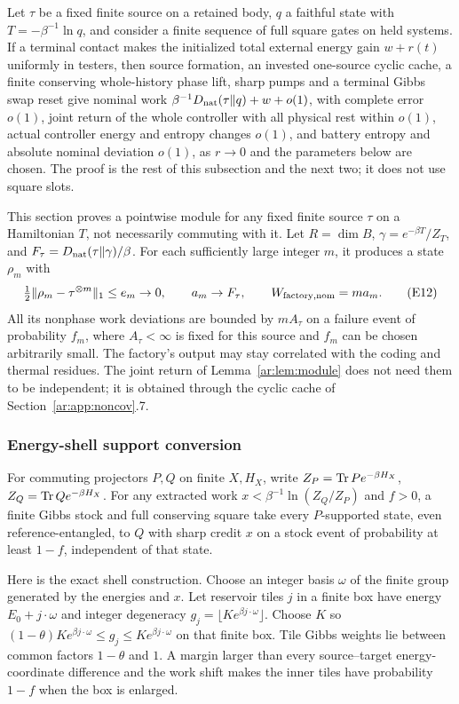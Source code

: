 \begin{lemma}\label{ar:lem:module}
Let $\tau$ be a fixed finite source on a retained body, $q$ a faithful state with $T=-\beta^{-1}\ln q$, and consider a finite sequence of full square gates on held systems. If a terminal contact makes the initialized total external energy gain $w+r(t)$ uniformly in testers, then source formation, an invested one-source cyclic cache, a finite conserving whole-history phase lift, sharp pumps and a terminal Gibbs swap reset give nominal work $\beta^{-1}D_{\mathrm{nat}}(\tau\|q)+w+o(1)$, with complete error $o(1)$, joint return of the whole controller with all physical rest within $o(1)$, actual controller energy and entropy changes $o(1)$, and battery entropy and absolute nominal deviation $o(1)$, as $r\to0$ and the parameters below are chosen. The proof is the rest of this subsection and the next two; it does not use square slots.
\end{lemma}
This section proves a pointwise module for any fixed finite source
\(\tau\) on a Hamiltonian \(T\), not necessarily commuting with it.
Let \(R=\dim B\), \(\gamma=e^{-\beta T}/Z_T\), and
\(F_\tau=D_{\mathrm{nat}}(\tau\|\gamma)/\beta\). For each sufficiently large integer
\(m\), it produces a state \(\rho_m\) with
\[
 \tfrac12\|\rho_m-\tau^{\otimes m}\|_1\le e_m\to0,\qquad
 a_m\to F_\tau,\qquad W_{\rm factory,nom}=ma_m.       \tag{E12}
\]
All its nonphase work deviations are bounded by \(mA_\tau\) on a
failure event of probability \(f_m\), where \(A_\tau<\infty\) is fixed
for this source and \(f_m\) can be chosen arbitrarily small.
The factory's output may stay correlated with the coding and thermal
residues. The joint return of Lemma~\ref{ar:lem:module} does not need them to be
independent; it is obtained through the cyclic cache of Section~\ref{ar:app:noncov}.7.

\subsubsection{Energy-shell support conversion}
For commuting projectors \(P,Q\) on finite \(X,H_X\), write
\(Z_P=\operatorname{Tr} Pe^{-\beta H_X}\), \(Z_Q=\operatorname{Tr} Qe^{-\beta H_X}\).
For any extracted work \(x<\beta^{-1}\ln(Z_Q/Z_P)\) and \(f>0\),
a finite Gibbs stock and full conserving square take every \(P\)-supported
state, even reference-entangled, to \(Q\) with sharp credit \(x\) on a
stock event of probability at least \(1-f\), independent of that state.

Here is the exact shell construction. Choose an integer basis
\(\omega\) of the finite group generated by the energies and \(x\).
Let reservoir tiles \(j\) in a finite box have energy
\(E_0+j\cdot\omega\) and integer degeneracy
\(g_j=\lfloor K e^{\beta j\cdot\omega}\rfloor\).
Choose \(K\) so
\((1-\theta)K e^{\beta j\cdot\omega}\le g_j\le
K e^{\beta j\cdot\omega}\) on that finite box.
Tile Gibbs weights lie between common factors \(1-\theta\) and \(1\).
A margin larger than every source--target energy-coordinate difference
and the work shift makes the inner tiles have probability \(1-f\)
when the box is enlarged.

